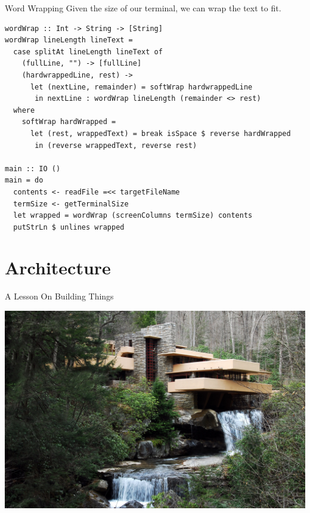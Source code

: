 \documentclass[10pt, presentation, colorlinks]{beamer}
\begin{document}
\begin{frame}[label={sec:org5eaff74},fragile]{Word Wrapping}
 Given the size of our terminal, we can wrap the text to fit.

\pause
\bigskip

\begin{verbatim}
wordWrap :: Int -> String -> [String]
wordWrap lineLength lineText =
  case splitAt lineLength lineText of
    (fullLine, "") -> [fullLine]
    (hardwrappedLine, rest) ->
      let (nextLine, remainder) = softWrap hardwrappedLine
       in nextLine : wordWrap lineLength (remainder <> rest)
  where
    softWrap hardWrapped =
      let (rest, wrappedText) = break isSpace $ reverse hardWrapped
       in (reverse wrappedText, reverse rest)

main :: IO ()
main = do
  contents <- readFile =<< targetFileName
  termSize <- getTerminalSize
  let wrapped = wordWrap (screenColumns termSize) contents
  putStrLn $ unlines wrapped
\end{verbatim}
\end{frame}

\section{Architecture}
\label{sec:org02e57ae}

\begin{frame}[label={sec:org6ecc61e}]{A Lesson On Building Things}
\begin{center}
\includegraphics[height=0.6\textheight]{./img/architecture.jpg}
\end{center}
\end{frame}
\end{document}
